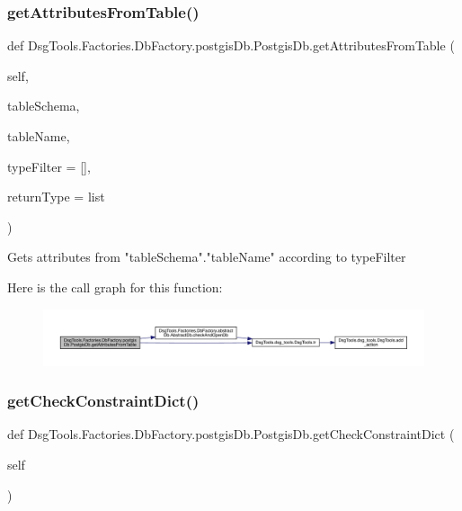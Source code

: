 \subsubsection{\texorpdfstring{get\+Attributes\+From\+Table()}{getAttributesFromTable()}}
{\footnotesize\ttfamily def Dsg\+Tools.\+Factories.\+Db\+Factory.\+postgis\+Db.\+Postgis\+Db.\+get\+Attributes\+From\+Table (\begin{DoxyParamCaption}\item[{}]{self,  }\item[{}]{table\+Schema,  }\item[{}]{table\+Name,  }\item[{}]{type\+Filter = {\ttfamily \mbox{[}\mbox{]}},  }\item[{}]{return\+Type = {\ttfamily \textquotesingle{}list\textquotesingle{}} }\end{DoxyParamCaption})}

\begin{DoxyVerb}Gets attributes from "tableSchema"."tableName" according to typeFilter
\end{DoxyVerb}
 Here is the call graph for this function\+:
\nopagebreak
\begin{figure}[H]
\begin{center}
\leavevmode
\includegraphics[width=350pt]{class_dsg_tools_1_1_factories_1_1_db_factory_1_1postgis_db_1_1_postgis_db_a80b242158d478b0ee5ebb58f31a13be5_cgraph}
\end{center}
\end{figure}
\mbox{\label{class_dsg_tools_1_1_factories_1_1_db_factory_1_1postgis_db_1_1_postgis_db_a49aa7680effc4959070cf54be941d5ad}} 
\subsubsection{\texorpdfstring{get\+Check\+Constraint\+Dict()}{getCheckConstraintDict()}}
{\footnotesize\ttfamily def Dsg\+Tools.\+Factories.\+Db\+Factory.\+postgis\+Db.\+Postgis\+Db.\+get\+Check\+Constraint\+Dict (\begin{DoxyParamCaption}\item[{}]{self }\end{DoxyParamCaption})}


